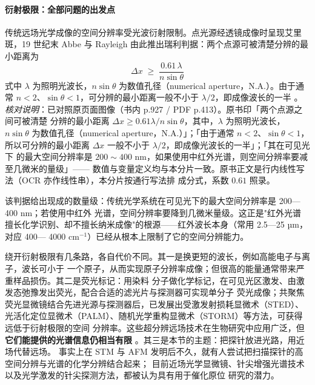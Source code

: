 \paragraph{衍射极限：全部问题的出发点}
\begin{principle}
传统远场光学成像的空间分辨率受光波衍射限制。点光源经透镜成像时呈现艾里斑，19 世纪末
Abbe 与 Rayleigh 由此推出瑞利判据：两个点源可被清楚分辨的最小距离为
\begin{equation}\label{eq:rayleigh}
\Delta x \;\geq\; \frac{0.61\,\lambda}{n\sin\theta}
\end{equation}
式中 $\lambda$ 为照明光波长，$n\sin\theta$ 为数值孔径（numerical aperture，N.A.）。由于通常
$n<2$、$\sin\theta<1$，可分辨的最小距离一般不小于 $\lambda/2$，即成像波长的一半
。
\emph{核对说明}：已对照原页面图像（书内 p.927 / PDF p.413）。原书印「两个点源之间可被清楚
分辨的最小距离 $\Delta x \geq 0.61\lambda/n\sin\theta$，其中，$\lambda$ 为照明光波长，
$n\sin\theta$ 为数值孔径（numerical aperture，N.A.）」；「由于通常 $n<2$、$\sin\theta<1$，
所以可分辨的最小距离 $\Delta x$ 一般不小于 $\lambda/2$，即成像光波长的一半」；「其在可见光下
的最大空间分辨率是 $200\sim400$ nm，如果使用中红外光谱，则空间分辨率要减至几微米的量级」——
数值与变量定义均与本分片一致。原书正文是行内线性写法（OCR 亦作线性串），本分片按通行写法排
成分式，系数 $0.61$ 照录。
\end{principle}

该判据给出现成的数量级：传统光学系统在可见光下的最大空间分辨率是 200—400 nm；若使用中红外
光谱，空间分辨率要降到几微米量级。这正是"红外光谱
擅长化学识别、却不擅长纳米成像"的根源——红外波长本身（常用 2.5—25 µm，对应 400—
4000 cm$^{-1}$）已经从根本上限制了它的空间分辨能力。

绕开衍射极限有几条路，各自代价不同。其一是换更短的波长，例如高能电子与离子，波长可小于
一个原子，从而实现原子分辨率成像；但很高的能量通常带来严重样品损伤。其二是荧光标记：用染料
分子做化学标记，在可见光区激发、由激发态弛豫发出荧光，配合合适的滤光片与探测器可实现单分子
荧光成像；共聚焦荧光显微镜结合先进光源与探测器后，已发展出受激发射损耗显微术（STED）、
光活化定位显微术（PALM）、随机光学重构显微术（STORM）等方法，可获得远低于衍射极限的空间
分辨率。这些超分辨远场技术在生物研究中应用广泛，但\textbf{它们能提供的光谱信息仍相当有限}
。其三是本节的主题：把探针放进光路，用近场代替远场。
事实上在 STM 与 AFM 发明后不久，就有人尝试把扫描探针的高空间分辨与光谱的化学分辨结合起来；
目前近场光学显微镜、针尖增强光谱技术以及光学激发的针尖探测方法，都被认为具有用于催化原位
研究的潜力。

